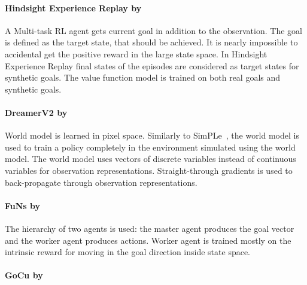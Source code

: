 \documentclass[acmsmall, nonacm]{acmart}
\begin{document}

\paragraph{Hindsight Experience Replay by~\citet{andrychowicz_hindsight_2017}} %
\label{par:hindsight}

A Multi-task RL agent gets current goal in addition to the observation. The goal is defined as the target state, that should be achieved. It is nearly impossible to accidental get the positive reward in the large state space. In Hindsight Experience Replay final states of the episodes are considered as target states for synthetic goals. The value function model is trained on both real goals and synthetic goals.


\paragraph{DreamerV2 by~\citet{Kaiser2020ModelBasedRL}} %
\label{par:dreamer_v2}

World model is learned in pixel space. Similarly to SimPLe~\citep{Kaiser2020ModelBasedRL}, the world model is used to train a policy completely in the environment simulated using the world model. The world model uses vectors of discrete variables instead of continuous variables for observation representations. Straight-through gradients is used to back-propagate through observation representations.


\paragraph{FuNs by~\citet{Vezhnevets2017FeUdalNF}} %
\label{par:funs}

The hierarchy of two agents is used: the master agent produces the goal vector and the worker agent produces actions. Worker agent is trained mostly on the intrinsic reward for moving in the goal direction inside state space.



\paragraph{GoCu by~\citet{Bougie2019SkillbasedCF}} %
\label{par:gocu}
\end{document}
